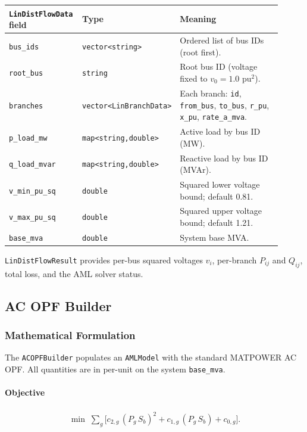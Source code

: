 \begin{longtable}{L{0.27\linewidth}L{0.17\linewidth}L{0.47\linewidth}}
\toprule
\texttt{LinDistFlowData} field & Type & Meaning \\
\midrule
\endhead
\texttt{bus\_ids} & \texttt{vector<string>} & Ordered list of bus IDs (root first). \\
\texttt{root\_bus} & \texttt{string} & Root bus ID (voltage fixed to $v_0 = 1.0$ pu$^2$). \\
\texttt{branches} & \texttt{vector<LinBranchData>} & Each branch: \texttt{id}, \texttt{from\_bus}, \texttt{to\_bus}, \texttt{r\_pu}, \texttt{x\_pu}, \texttt{rate\_a\_mva}. \\
\texttt{p\_load\_mw} & \texttt{map<string,double>} & Active load by bus ID (MW). \\
\texttt{q\_load\_mvar} & \texttt{map<string,double>} & Reactive load by bus ID (MVAr). \\
\texttt{v\_min\_pu\_sq} & \texttt{double} & Squared lower voltage bound; default 0.81. \\
\texttt{v\_max\_pu\_sq} & \texttt{double} & Squared upper voltage bound; default 1.21. \\
\texttt{base\_mva} & \texttt{double} & System base MVA. \\
\bottomrule
\end{longtable}

\texttt{LinDistFlowResult} provides per-bus squared voltages $v_i$, per-branch
$P_{ij}$ and $Q_{ij}$, total loss, and the AML solver status.

\subsection{AC OPF Builder}
\label{sec:acopf-builder}

\subsubsection{Mathematical Formulation}

The \texttt{ACOPFBuilder} populates an \texttt{AMLModel} with the standard
MATPOWER AC OPF.  All quantities are in per-unit on the system \texttt{base\_mva}.

\paragraph{Objective}
\begin{align}
\min\;\sum_{g}\bigl[c_{2,g}\,(P_{g}\,S_b)^2 + c_{1,g}\,(P_{g}\,S_b) + c_{0,g}\bigr].
\end{align}

